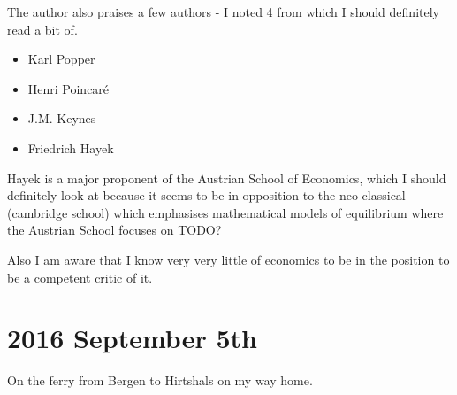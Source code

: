 \bigskip

The author also praises a few authors - I noted 4 from which I should definitely read a bit of.

\begin{itemize}
\item Karl Popper
\item Henri Poincaré
\item J.M. Keynes
\item Friedrich Hayek
\end{itemize}

Hayek is a major proponent of the Austrian School of Economics, which I should definitely look at because it seems to be in opposition to the neo-classical (cambridge school) which emphasises mathematical models of equilibrium where the Austrian School focuses on TODO?

\bigskip

Also I am aware that I know very very little of economics to be in the position to be a competent critic of it. 

\section*{2016 September 5th}
On the ferry from Bergen to Hirtshals on my way home. \\

